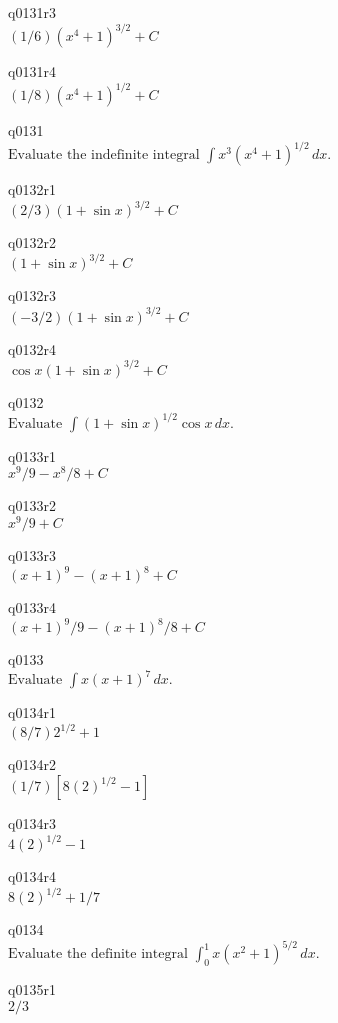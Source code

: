 q0131r3\\
\(\displaystyle (1/6) (x^4 + 1)^{3/2} + C \)

q0131r4\\
\(\displaystyle (1/8)(x^4 + 1)^{1/2} + C \)

q0131\\
\(\displaystyle \text{Evaluate the indefinite integral } \int x^3 (x^4 + 1)^{1/2} \, dx. \)

q0132r1\\
\(\displaystyle (2/3) (1 + \sin x)^{3/2} + C \)

q0132r2\\
\(\displaystyle (1 + \sin x)^{3/2} + C \)

q0132r3\\
\(\displaystyle (-3/2) (1 + \sin x)^{3/2} + C \)

q0132r4\\
\(\displaystyle \cos x (1 + \sin x)^{3/2} + C \)

q0132\\
\(\displaystyle \text{Evaluate } \int (1 + \sin x)^{1/2} \cos x \, dx. \)

q0133r1\\
\(\displaystyle x^9/9 - x^8/8 + C \)

q0133r2\\
\(\displaystyle x^9/9 + C \)

q0133r3\\
\(\displaystyle (x+1)^9 - (x+1)^8 + C \)

q0133r4\\
\(\displaystyle (x+1)^9/9 - (x+1)^8/8 + C \)

q0133\\
\(\displaystyle \text{Evaluate } \int x(x + 1)^7 \, dx. \)

q0134r1\\
\(\displaystyle (8/7)2^{1/2} + 1 \)

q0134r2\\
\(\displaystyle (1/7)[8(2)^{1/2} - 1] \)

q0134r3\\
\(\displaystyle 4(2)^{1/2} - 1 \)

q0134r4\\
\(\displaystyle 8(2)^{1/2} + 1/7 \)

q0134\\
\(\displaystyle \text{Evaluate the definite integral } \int_0^1 x(x^2 + 1)^{5/2} \, dx. \)

q0135r1\\
\(\displaystyle 2/3 \)

